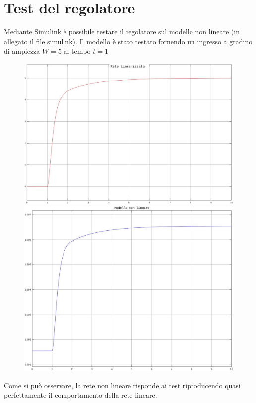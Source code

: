 \documentclass[a4paper,12pt,italian]{article}
\begin{document}
\section{Test del regolatore}

Mediante Simulink è possibile testare il regolatore sul modello non lineare (in allegato il file simulink).
Il modello è stato testato fornendo un ingresso a gradino di ampiezza $W=5$ al tempo $t=1$

\begin{figure}[h!]
    \centering
    \begin{minipage}{0.45\textwidth}
        \centering
        \includegraphics[scale=0.2]{img/modello_lineare.jpg}
    \end{minipage}\hspace{2em}
    \begin{minipage}{0.45\textwidth}
        \centering
        \includegraphics[scale=0.23]{img/modello_non_lineare.jpg}
    \end{minipage}
\end{figure}

Come si può osservare, la rete non lineare risponde ai test riproducendo quasi perfettamente il comportamento della rete lineare.
\end{document}
